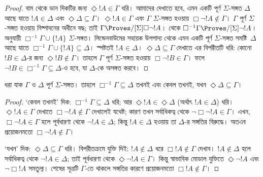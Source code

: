 \documentclass[../../../include/open-logic-section]{subfiles}
\begin{document}
{\begin{proof}
  বাম থেকে ডান দিকটির জন্য $\Diamond !A \in \Gamma$ ধরি। আমাদের দেখাতে হবে, এমন একটি পূর্ণ $\Sigma$-সঙ্গত $\Delta$ আছে যাতে $!A \in \Delta$ এবং $\Diamond\Delta \subseteq \Gamma$। $\Diamond !A \in \Gamma$ এবং $\Gamma$ $\Sigma$-সঙ্গত হওয়ায় $\Box\lnot !A \notin \Gamma$। $\Gamma$ পূর্ণ $\Sigma$-সঙ্গত হওয়ায় নিষ্পাদনের অধীনে বদ্ধ; তাই $\Gamma
  \Proves/[\Sigma] \Box\lnot !A$।  থেকে $\Box^{-1}\Gamma \Proves/[\Sigma] \lnot !A$।  অনুযায়ী $\Box^{-1}\Gamma \cup \{ !A \}$ $\Sigma$-সঙ্গত। লিন্ডেনবাউমের সহায়ক উপপাদ্য থেকে এমন একটি পূর্ণ $\Sigma$-সঙ্গত সমষ্টি~$\Delta$ আছে যাতে $\Box^{-1}\Gamma \cup \{ !A \} \subseteq
  \Delta$। স্পষ্টতই $!A \in \Delta$। $\Diamond\Delta
  \subseteq \Gamma$ দেখাতে এর বিপরীতটি ধরি: কোনো $!B \in \Delta$-র জন্য $\Diamond !B \notin \Gamma$। তাহলে $\Gamma$ পূর্ণ $\Sigma$-সঙ্গত হওয়ায় $\Box\lnot !B \in \Gamma$। ফলে $\lnot
  !B \in \Box^{-1}\Gamma \subseteq \Delta$-ও হবে, যা $\Delta$-কে অসঙ্গত করবে।
\end{proof}
}

\begin{lem}
  ধরা যাক $\Gamma$ ও $\Delta$ পূর্ণ $\Sigma$-সঙ্গত। তাহলে $\Box^{-1}\Gamma \subseteq \Delta$ তখনই এবং কেবল তখনই, যখন $\Diamond\Delta \subseteq \Gamma$।
\end{lem}

\begin{proof}
  ‘কেবল তখনই’ দিক: $\Box^{-1}\Gamma \subseteq \Delta$ ধরি; আর $\Diamond!A \in \Diamond\Delta$ (অর্থাৎ $!A \in \Delta$) ধরি। $\Diamond!A \in \Gamma$ দেখাতে $\Box\lnot!A \notin \Gamma$ দেখালেই যথেষ্ট; কারণ তখন সর্বাধিকত্ব থেকে $\lnot\Box\lnot
  !A \in \Gamma$। এখন, $\Box\lnot!A \in \Gamma$ হলে পূর্বধারণা থেকে $\lnot!A \in \Delta$; কিন্তু $!A \in \Delta$ হওয়ায় তা $\Delta$-র সঙ্গতির বিরুদ্ধে। অতএব প্রয়োজনমতো $\Box\lnot!A \notin \Gamma$।

  ‘যখন’ দিক: $\Diamond\Delta
  \subseteq \Gamma$ ধরি। বিপরীতক্রমে যুক্তি দিই: $!A
  \notin \Delta$ ধরে $\Box!A \notin \Gamma$ দেখাব। $!A \notin \Delta$ হলে সর্বাধিকত্ব থেকে $\lnot!A \in \Delta$; তাই পূর্বধারণা থেকে $\Diamond\lnot!A \in \Gamma$। কিন্তু স্বাভাবিক মোডাল যুক্তিতে $\Diamond\lnot!A$ এবং $\lnot\Box !A$ সমতুল্য। শেষের সূত্রটি $\Gamma$-তে থাকলে সঙ্গতির কারণে প্রয়োজনমতো $\Box!A \notin\Gamma$।
\end{proof}
\end{document}
